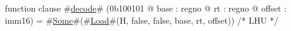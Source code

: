 function clause #\hyperref[zdecode]{decode}# (0b100101 @ base : regno @ rt : regno @ offset : imm16) =
  #\hyperref[zSome]{Some}#(#\hyperref[zLoad]{Load}#(H, false, false, base, rt, offset)) /* LHU */
